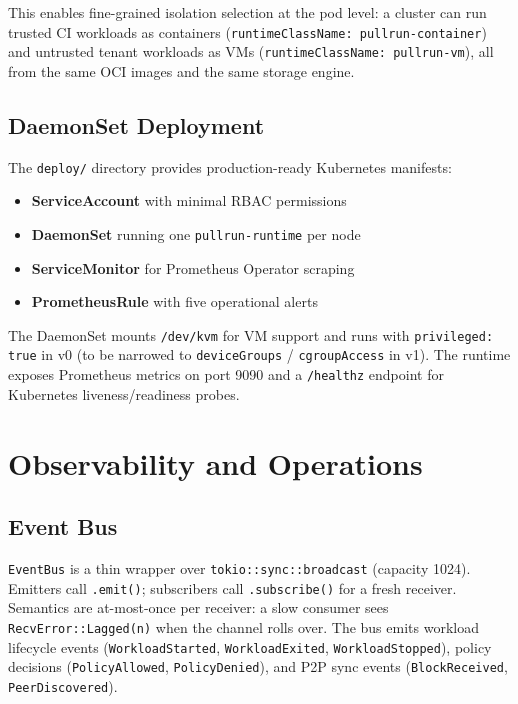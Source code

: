 \documentclass[11pt,a4paper]{article}
\begin{document}
This enables fine-grained isolation selection at the pod level: a cluster can run trusted CI workloads as containers (\texttt{runtimeClassName: pullrun-container}) and untrusted tenant workloads as VMs (\texttt{runtimeClassName: pullrun-vm}), all from the same OCI images and the same storage engine.

\subsection{DaemonSet Deployment}

The \texttt{deploy/} directory provides production-ready Kubernetes manifests:

\begin{itemize}[leftmargin=*]
    \item \textbf{ServiceAccount} with minimal RBAC permissions
    \item \textbf{DaemonSet} running one \texttt{pullrun-runtime} per node
    \item \textbf{ServiceMonitor} for Prometheus Operator scraping
    \item \textbf{PrometheusRule} with five operational alerts
\end{itemize}

The DaemonSet mounts \texttt{/dev/kvm} for VM support and runs with \texttt{privileged: true} in v0 (to be narrowed to \texttt{deviceGroups} / \texttt{cgroupAccess} in v1). The runtime exposes Prometheus metrics on port 9090 and a \texttt{/healthz} endpoint for Kubernetes liveness/readiness probes.

\section{Observability and Operations}\label{sec:observability}

\subsection{Event Bus}

\texttt{EventBus} is a thin wrapper over \texttt{tokio::sync::broadcast} (capacity 1024). Emitters call \texttt{.emit()}; subscribers call \texttt{.subscribe()} for a fresh receiver. Semantics are at-most-once per receiver: a slow consumer sees \texttt{RecvError::Lagged(n)} when the channel rolls over. The bus emits workload lifecycle events (\texttt{WorkloadStarted}, \texttt{WorkloadExited}, \texttt{WorkloadStopped}), policy decisions (\texttt{PolicyAllowed}, \texttt{PolicyDenied}), and P2P sync events (\texttt{BlockReceived}, \texttt{PeerDiscovered}).
\end{document}
